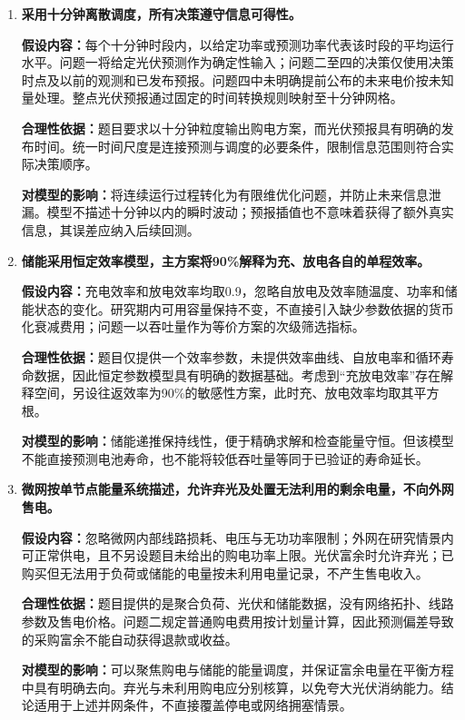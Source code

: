 \documentclass[UTF8,a4paper,12pt,fontset=fandol]{ctexart}
\numberwithin{equation}{section}
\begin{document}
\begin{enumerate}[label=\textbf{假设\arabic*：},leftmargin=4.5em]
\item \textbf{采用十分钟离散调度，所有决策遵守信息可得性。}

\textbf{假设内容：}每个十分钟时段内，以给定功率或预测功率代表该时段的平均运行水平。问题一将给定光伏预测作为确定性输入；问题二至四的决策仅使用决策时点及以前的观测和已发布预报。问题四中未明确提前公布的未来电价按未知量处理。整点光伏预报通过固定的时间转换规则映射至十分钟网格。

\textbf{合理性依据：}题目要求以十分钟粒度输出购电方案，而光伏预报具有明确的发布时间。统一时间尺度是连接预测与调度的必要条件，限制信息范围则符合实际决策顺序。

\textbf{对模型的影响：}将连续运行过程转化为有限维优化问题，并防止未来信息泄漏。模型不描述十分钟以内的瞬时波动；预报插值也不意味着获得了额外真实信息，其误差应纳入后续回测。

\item \textbf{储能采用恒定效率模型，主方案将90\%解释为充、放电各自的单程效率。}

\textbf{假设内容：}充电效率和放电效率均取0.9，忽略自放电及效率随温度、功率和储能状态的变化。研究期内可用容量保持不变，不直接引入缺少参数依据的货币化衰减费用；问题一以吞吐量作为等价方案的次级筛选指标。

\textbf{合理性依据：}题目仅提供一个效率参数，未提供效率曲线、自放电率和循环寿命数据，因此恒定参数模型具有明确的数据基础。考虑到“充放电效率”存在解释空间，另设往返效率为90\%的敏感性方案，此时充、放电效率均取其平方根。

\textbf{对模型的影响：}储能递推保持线性，便于精确求解和检查能量守恒。但该模型不能直接预测电池寿命，也不能将较低吞吐量等同于已验证的寿命延长。

\item \textbf{微网按单节点能量系统描述，允许弃光及处置无法利用的剩余电量，不向外网售电。}

\textbf{假设内容：}忽略微网内部线路损耗、电压与无功功率限制；外网在研究情景内可正常供电，且不另设题目未给出的购电功率上限。光伏富余时允许弃光；已购买但无法用于负荷或储能的电量按未利用电量记录，不产生售电收入。

\textbf{合理性依据：}题目提供的是聚合负荷、光伏和储能数据，没有网络拓扑、线路参数及售电价格。问题二规定普通购电费用按计划量计算，因此预测偏差导致的采购富余不能自动获得退款或收益。

\textbf{对模型的影响：}可以聚焦购电与储能的能量调度，并保证富余电量在平衡方程中具有明确去向。弃光与未利用购电应分别核算，以免夸大光伏消纳能力。结论适用于上述并网条件，不直接覆盖停电或网络拥塞情景。


\end{enumerate}
\end{document}
